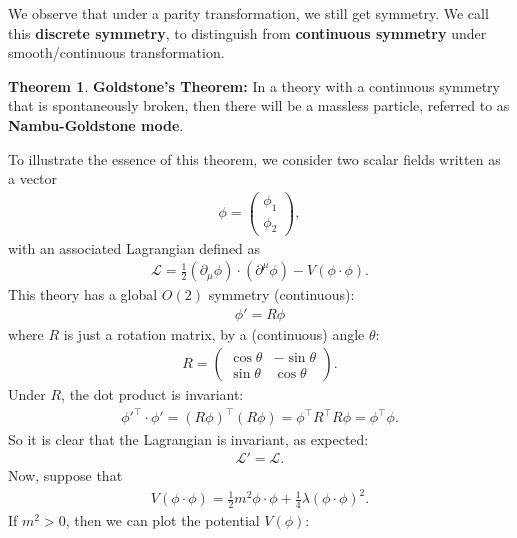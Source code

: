\documentclass{book}
\numberwithin{equation}{section}
\theoremstyle{definition}
\newtheorem{thm}{Theorem}[section]
\newcommand{\p}{\partial}
\newcommand{\lag}{\mathcal{L}}
\begin{document}
We observe that under a parity transformation, we still get symmetry. We call this \textbf{discrete symmetry}, to distinguish from \textbf{continuous symmetry} under smooth/continuous transformation.\\

\begin{thm}
	\textbf{Goldstone's Theorem:} In a theory with a continuous symmetry that is spontaneously broken, then there will be a massless particle, referred to as \textbf{Nambu-Goldstone mode}. 
\end{thm}
To illustrate the essence of this theorem, we consider two scalar fields written as a vector
\begin{align}
\phi = \begin{pmatrix}
\phi_1 \\ \phi_2
\end{pmatrix},
\end{align}
with an associated Lagrangian defined as
\begin{align}
\lag = \frac{1}{2}(\p_\mu\phi)\cdot(\p^\mu\phi) - V(\phi \cdot \phi).
\end{align}
This theory has a global $O(2)$ symmetry (continuous):
\begin{align}
\phi' = R\phi
\end{align}
where $R$ is just a rotation matrix, by a (continuous) angle $\theta$:
\begin{align}
R = \begin{pmatrix}
\cos\theta & -\sin\theta\\
\sin\theta & \cos\theta
\end{pmatrix}.
\end{align}
Under $R$, the dot product is invariant:
\begin{align}
\phi'^\top\cdot\phi' = (R\phi)^\top(R\phi) = \phi^\top R^\top R\phi = \phi^\top \phi.
\end{align}
So it is clear that the Lagrangian is invariant, as expected:
\begin{align}
\lag' = \lag.
\end{align}
Now, suppose that
\begin{align}
V(\phi\cdot\phi) = \frac{1}{2}m^2\phi\cdot\phi + \frac{1}{4}\lambda(\phi\cdot\phi)^2.
\end{align}
If $m^2 > 0$, then we can plot the potential $V(\phi)$:
\end{document}
